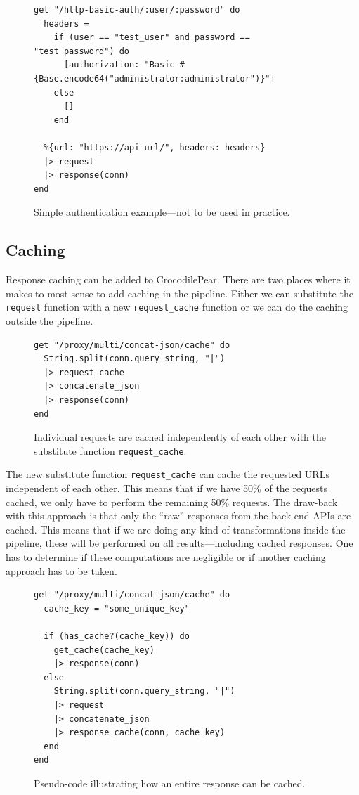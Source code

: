 \documentclass{cslthse-msc}
\begin{document}
\begin{figure}[H]
  \centering
\begin{lstlisting}[breaklines=true,frame=single]
get "/http-basic-auth/:user/:password" do
  headers =
    if (user == "test_user" and password == "test_password") do
      [authorization: "Basic #{Base.encode64("administrator:administrator")}"]
    else
      []
    end
  
  %{url: "https://api-url/", headers: headers}
  |> request
  |> response(conn)
end
\end{lstlisting}
  \caption{Simple authentication example---not to be used in practice.}
\end{figure}

\subsection{Caching}
Response caching can be added to CrocodilePear. There are two places where it makes to most sense to add caching in the pipeline. Either we can substitute the \lstinline{request} function with a new \lstinline{request_cache} function or we can do the caching outside the pipeline. 

\begin{figure}[H]
  \centering
\begin{lstlisting}[breaklines=true,frame=single]
get "/proxy/multi/concat-json/cache" do
  String.split(conn.query_string, "|")
  |> request_cache
  |> concatenate_json
  |> response(conn)
end
\end{lstlisting}
  \caption{Individual requests are cached independently of each other with the substitute function \lstinline{request_cache}.}
\end{figure}

The new substitute function \lstinline{request_cache} can cache the requested URLs independent of each other. This means that if we have 50\% of the requests cached, we only have to perform the remaining 50\% requests. The draw-back with this approach is that only the \enquote{raw} responses from the back-end APIs are cached. This means that if we are doing any kind of transformations inside the pipeline, these will be performed on all results---including cached responses. One has to determine if these computations are negligible or if another caching approach has to be taken.

\begin{figure}[H]
  \centering
\begin{lstlisting}[breaklines=true,frame=single]
get "/proxy/multi/concat-json/cache" do
  cache_key = "some_unique_key"
  
  if (has_cache?(cache_key)) do
    get_cache(cache_key)
    |> response(conn)
  else
    String.split(conn.query_string, "|")
    |> request
    |> concatenate_json
    |> response_cache(conn, cache_key)
  end
end
\end{lstlisting}
  \caption{Pseudo-code illustrating how an entire response can be cached.}
\end{figure}
\end{document}
